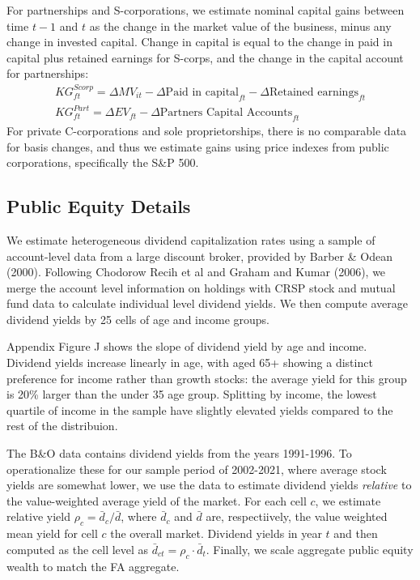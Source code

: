 \documentclass[12pt]{article}
\begin{document}
For partnerships and S-corporations, we estimate nominal capital gains between time $t-1$ and $t$ as the change in the market value of the business, minus any change in invested capital. Change in capital is equal to the change in paid in capital plus retained earnings for S-corps, and the change in the capital account for partnerships:
\begin{align}
KG_{ft}^{Scorp} = \Delta MV_{it}  - \Delta \text{Paid in capital}_{ft} - \Delta \text{Retained earnings}_{ft} \label{eq:kgcomputation} \\
KG_{ft}^{Part} = \Delta EV_{ft}  - \Delta \text{Partners Capital Accounts}_{ft}
\end{align}
For private C-corporations and sole proprietorships, there is no comparable data for basis changes, and thus we estimate gains using price indexes from public corporations, specifically the S\&P 500. 


\subsection{Public Equity Details}

We estimate heterogeneous dividend capitalization rates using a sample of account-level data from a large discount broker, provided by Barber \& Odean (2000). Following Chodorow Recih et al and Graham and Kumar (2006), we merge the account level information on holdings with CRSP stock and mutual fund data to calculate individual level dividend yields. We then compute average dividend yields by 25 cells of age and income groups. 

Appendix Figure J shows the slope of dividend yield by age and income. Dividend yields increase linearly in age, with aged 65+ showing a distinct preference for income rather than growth stocks: the average yield for this group is 20\% larger than the under 35 age group. Splitting by income, the lowest quartile of income in the sample have slightly elevated yields compared to the rest of the distribuion. 

The B\&O data contains dividend yields from the years 1991-1996. To operationalize these for our sample period of 2002-2021, where average stock yields are somewhat lower, we use the data to estimate dividend yields \textit{relative} to the value-weighted average yield of the market. For each cell $c$, we estimate relative yield $\rho_c = \bar{d}_c / \bar{d}$, where $\bar{d}_c$ and $\bar{d}$ are, respectiively,  the value weighted mean yield for cell $c$ the overall market. Dividend yields in year $t$ and then computed as the cell level as $\bar{d}_{ct} = \rho_c \cdot \bar{d}_t$. Finally, we scale aggregate public equity wealth to match the FA aggregate. 
\end{document}
